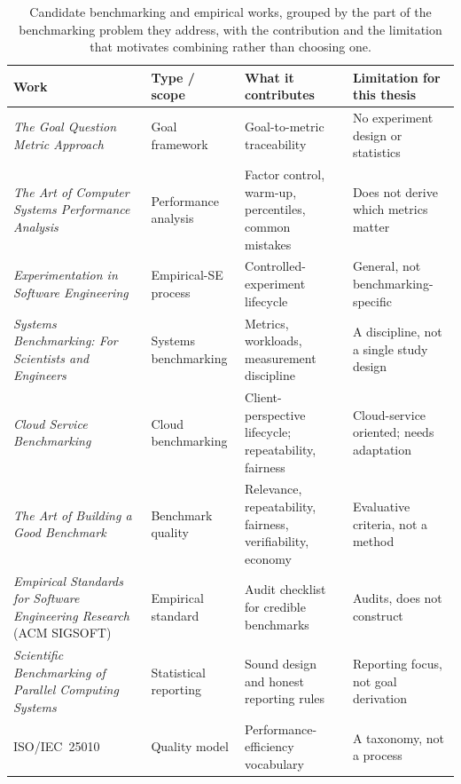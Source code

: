 \begin{table}[htbp]
    \centering
    \small
    \setlength{\tabcolsep}{3pt}
    \begin{tabularx}{\textwidth}{@{}>{\raggedright\arraybackslash}p{3.6cm} >{\raggedright\arraybackslash}p{2.3cm} >{\raggedright\arraybackslash}X >{\raggedright\arraybackslash}X@{}}
        \toprule
        \textbf{Work} & \textbf{Type / scope} & \textbf{What it contributes} & \textbf{Limitation for this thesis} \\
        \midrule
        \emph{The Goal Question Metric Approach}~\citep{caldiera1994goal} & Goal framework & Goal-to-metric traceability & No experiment design or statistics \\
        \addlinespace
        \emph{The Art of Computer Systems Performance Analysis}~\citep{jain1991art} & Performance analysis & Factor control, warm-up, percentiles, common mistakes & Does not derive which metrics matter \\
        \addlinespace
        \emph{Experimentation in Software Engineering}~\citep{wohlin2012experimentation} & Empirical-SE process & Controlled-experiment lifecycle & General, not benchmarking-specific \\
        \addlinespace
        \emph{Systems Benchmarking: For Scientists and Engineers}~\citep{kounev2020systems} & Systems benchmarking & Metrics, workloads, measurement discipline & A discipline, not a single study design \\
        \addlinespace
        \emph{Cloud Service Benchmarking}~\citep{bermbach2017cloud} & Cloud benchmarking & Client-perspective lifecycle; repeatability, fairness & Cloud-service oriented; needs adaptation \\
        \addlinespace
        \emph{The Art of Building a Good Benchmark}~\citep{huppler2009art} & Benchmark quality & Relevance, repeatability, fairness, verifiability, economy & Evaluative criteria, not a method \\
        \addlinespace
        \emph{Empirical Standards for Software Engineering Research} (ACM SIGSOFT)~\citep{Ralph2020, hasselbring2021benchmarking} & Empirical standard & Audit checklist for credible benchmarks & Audits, does not construct \\
        \addlinespace
        \emph{Scientific Benchmarking of Parallel Computing Systems}~\citep{hoefler2015scientific} & Statistical reporting & Sound design and honest reporting rules & Reporting focus, not goal derivation \\
        \addlinespace
        ISO/IEC~25010~\citep{iso25010} & Quality model & Performance-efficiency vocabulary & A taxonomy, not a process \\
        \bottomrule
    \end{tabularx}
    \caption[Benchmarking methodologies compared]{Candidate benchmarking and empirical works, grouped by the part of the benchmarking problem they address, with the contribution and the limitation that motivates combining rather than choosing one.}
    \label{tab:methodology-comparison}
\end{table}

